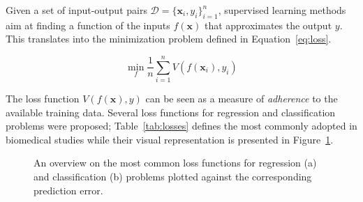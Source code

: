 
    Given a set of input-output pairs $\mathcal{D} = \{\bm{x}_i, y_i\}_{i=1}^n$, supervised learning methods aim at finding a function of the inputs $f(\bm{x})$ that approximates the output $y$. This translates into the minimization problem defined in Equation~\eqref{eq:loss}.

    \begin{equation}\label{eq:loss}
      \min_f \frac{1}{n}\sum_{i=1}^n V(f(\bm{x}_i),y_i) %
    \end{equation}

    The loss function $V(f(\bm{x}),y)$ can be seen as a measure of \textit{adherence} to the available training data. Several loss functions for regression and classification problems were proposed; Table~\ref{tab:losses} defines the most commonly adopted in biomedical studies while their visual representation is presented in Figure~\ref{fig:loss}. 

    \begin{figure}[!h]
    	\centering
    	\caption{An overview on the most common loss functions for regression (a) and classification (b) problems plotted against the corresponding prediction error.}\label{fig:loss}
    \end{figure}


